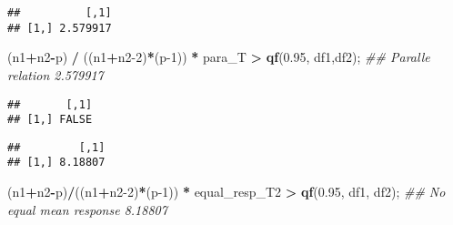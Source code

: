 \documentclass[]{article}
\newenvironment{Shaded}{\begin{snugshade}}{\end{snugshade}}
\newcommand{\CommentTok}[1]{\textcolor[rgb]{0.56,0.35,0.01}{\textit{#1}}}
\newcommand{\DecValTok}[1]{\textcolor[rgb]{0.00,0.00,0.81}{#1}}
\newcommand{\FloatTok}[1]{\textcolor[rgb]{0.00,0.00,0.81}{#1}}
\newcommand{\KeywordTok}[1]{\textcolor[rgb]{0.13,0.29,0.53}{\textbf{#1}}}
\newcommand{\NormalTok}[1]{#1}
\newcommand{\OperatorTok}[1]{\textcolor[rgb]{0.81,0.36,0.00}{\textbf{#1}}}
\newcommand{\StringTok}[1]{\textcolor[rgb]{0.31,0.60,0.02}{#1}}
\begin{document}
\begin{verbatim}
##          [,1]
## [1,] 2.579917
\end{verbatim}

\begin{Shaded}
\begin{Highlighting}[]
\NormalTok{(n1}\OperatorTok{+}\NormalTok{n2}\OperatorTok{-}\NormalTok{p) }\OperatorTok{/}\StringTok{ }\NormalTok{((n1}\OperatorTok{+}\NormalTok{n2}\DecValTok{-2}\NormalTok{)}\OperatorTok{*}\NormalTok{(p}\DecValTok{-1}\NormalTok{)) }\OperatorTok{*}\StringTok{ }\NormalTok{para_T }\OperatorTok{>}\StringTok{ }\KeywordTok{qf}\NormalTok{(}\FloatTok{0.95}\NormalTok{, df1,df2); }\CommentTok{## Paralle relation 2.579917}
\end{Highlighting}
\end{Shaded}

\begin{verbatim}
##       [,1]
## [1,] FALSE
\end{verbatim}

\begin{Shaded}
\end{Shaded}

\begin{verbatim}
##         [,1]
## [1,] 8.18807
\end{verbatim}

\begin{Shaded}
\begin{Highlighting}[]
\NormalTok{(n1}\OperatorTok{+}\NormalTok{n2}\OperatorTok{-}\NormalTok{p)}\OperatorTok{/}\NormalTok{((n1}\OperatorTok{+}\NormalTok{n2}\DecValTok{-2}\NormalTok{)}\OperatorTok{*}\NormalTok{(p}\DecValTok{-1}\NormalTok{)) }\OperatorTok{*}\StringTok{ }\NormalTok{equal_resp_T2 }\OperatorTok{>}\StringTok{ }\KeywordTok{qf}\NormalTok{(}\FloatTok{0.95}\NormalTok{, df1, df2); }\CommentTok{## No equal mean response 8.18807}
\end{Highlighting}
\end{Shaded}
\end{document}
